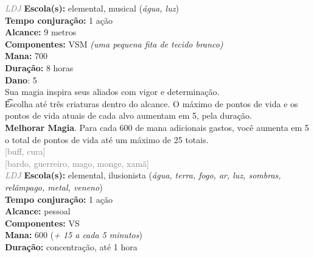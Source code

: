 \documentclass{RPG_Adventure}[2021/10/20]
\begin{document}
{\tiny \textcolor{gray}{\textit{LDJ}}}\jump{}
{\small \t \textbf{Escola(s):} elemental, musical (\textit{água, luz})\\\t \textbf{Tempo conjuração:} 1 ação\\\t \textbf{Alcance:} 9 metros\\\t \textbf{Componentes:} VSM \textit{(uma pequena fita de tecido branco)}\\\t \textbf{Mana:} 700\\\t \textbf{Duração:} 8 horas\\\t \textbf{Dano}: 5\\}
{\normalsize Sua magia inspira seus aliados com vigor e determinação.\\\t Escolha até três criaturas dentro do alcance. O máximo de pontos de vida e os pontos de vida atuais de cada alvo aumentam em 5, pela duração.\\\t \textbf{Melhorar Magia}. Para cada 600 de mana adicionais gastos, você aumenta em 5 o total de pontos de vida até um máximo de 25 totais.\\}
{\scriptsize \textcolor{gray}{[buff, cura]\\}}
{\scriptsize \textcolor{gray}{[bardo, guerreiro, mago, monge, xamã]\\}}
{\tiny \textcolor{gray}{\textit{LDJ}}}\jump{}
{\small \t \textbf{Escola(s):} elemental, ilusionista (\textit{água, terra, fogo, ar, luz, sombras, relâmpago, metal, veneno})\\\t \textbf{Tempo conjuração:} 1 ação\\\t \textbf{Alcance:} pessoal\\\t \textbf{Componentes:} VS\\\t \textbf{Mana:} 600 (\textit{+ 15 a cada 5 minutos})\\\t \textbf{Duração:} concentração, até 1 hora\\}
\end{document}
